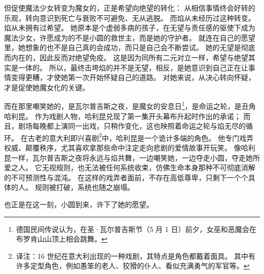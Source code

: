 但促使魔法少女转变为魔女的，正是希望向绝望的转化：
从相信事情终会好转的乐观，转向意识到死亡与衰败不可避免、无从逃脱。
而焰从未经历过这种转变。
焰从未拥有过希望。
她原本是个虚弱多病的孩子，在无望与责任感的驱使下成为魔法少女，许愿成为的不是小圆的救世主，而是她的守护者。
就连在自己的愿望里，她想象的也不是自己真的会成功，而只是自己会不断尝试。
她的无望是彻底而内在的，因此反而对绝望免疫。
这是因为同所有二元对立一样，希望与绝望其实是一体的。
所以，最终击垮焰的并不是无望，相反，是她意识到自己正在让事情变得更糟，才使她第一次开始怀疑自己的道路。
对她来说，从决心转向怀疑，才是促使她魔女化的关键。

而在那里嘲笑她的，是瓦尔普吉斯之夜，是魔女的安息日\footnote{%
    德国民间传说认为，在圣·瓦尔普吉斯节（5 月 1 日）前夕，女巫和恶魔会在布罗肯山山顶上相会跳舞。
}\cite{ref69}，是命运之轮，是丑角哈利昆。
作为戏剧人物，哈利昆兑现了第一集开头幕布升起时作出的承诺；
而且，剧场每晚都上演同一出戏，只稍作变化，这也映照着命运之轮与焰无尽的循环。
在古老的意大利即兴喜剧\footnote{%
    译注：16 世纪在意大利出现的一种戏剧，其特点是角色都戴着面具。
    其中有许多定型角色，例如愚笨的老人、狡猾的仆人、看似充满勇气的军官等。
}中，哈利昆是一个诡计多端的角色。
他专门戏弄权威、颠覆秩序，尤其喜欢拿那些命中注定走向悲剧的爱情故事开玩笑\cite{ref70}。
像哈利昆一样，瓦尔普吉斯之夜将永远与焰共舞，一边嘲笑她，一边夺走小圆，夺走她所爱之人。
它无视规则，也无法被任何系统收束，仿佛生命本身那种不可彻底消解的不可预测性与混沌。
在这样的戏弄者面前，不存在高低尊卑，只剩下一个个具体的人。
规则被打破，系统也随之崩塌。

也正是在这一刻，小圆到来，许下了她的愿望。
